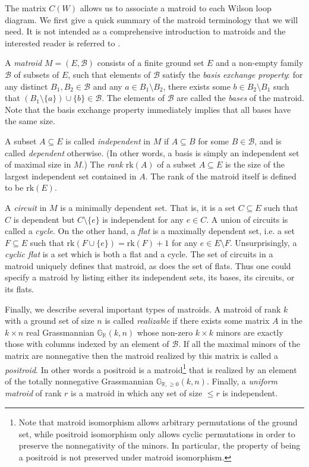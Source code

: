 \documentclass[11pt]{article}
\newcommand{\R}{\mathbb{R}}
\newcommand{\Gr}{\mathbb{G}_{\R, \geq 0}}
\newcommand{\rk}{\textrm{rk} }
\newcommand{\cB}{\mathcal{B}}
\theoremstyle{remark}
\theoremstyle{definition}
\begin{document}
The matrix $C(W)$ allows us to associate a matroid to each Wilson loop diagram. We first give a quick summary of the matroid terminology that we will need.  It is not intended as a comprehensive introduction to matroids and the interested reader is referred to \cite{OxleyMatroidBook}.

A {\em matroid} $M = (E,\cB)$ consists of a finite ground set $E$ and a non-empty family $\cB$ of subsets of $E$, such that elements of $\cB$ satisfy the {\em basis exchange property}: for any distinct $B_1,B_2 \in \cB$ and any $a \in B_1 \setminus B_2$, there exists some $b \in B_2 \setminus B_1$ such that $(B_1 \setminus \{a\})\cup \{b\} \in \cB$. The elements of $\cB$ are called the {\em bases} of the matroid. Note that the basis exchange property immediately implies that all bases have the same size.

A subset $A \subseteq E$ is called {\em independent} in $M$ if $A \subseteq B$ for some $B \in \cB$, and is called {\em dependent} otherwise. (In other words, a basis is simply an independent set of maximal size in $M$.) The {\em rank}  $\rk(A)$ of a subset $A \subseteq E$ is the size of the largest independent set contained in $A$. The rank of the matroid itself is defined to be $\rk(E)$.

A {\em circuit} in $M$ is a minimally dependent set. That is, it is a set $C \subseteq E$ such that $C$ is dependent but $C \setminus \{e\}$ is independent for any $e \in C$. A union of circuits is called a {\em cycle}. On the other hand, a {\em flat} is a maximally dependent set, i.e. a set $F \subseteq E$ such that $\rk(F \cup \{e\}) = \rk(F) + 1$ for any $e \in E \setminus F$. Unsurprisingly, a {\em cyclic flat} is a set which is both a flat and a cycle. The set of circuits in a matroid uniquely defines that matroid, as does the set of flats.  Thus one could specify a matroid by listing either its independent sets, its bases, its circuits, or its flats.

Finally, we describe several important types of matroids. A matroid of rank $k$ with a ground set of size $n$ is called {\em realizable} if there exists some matrix $A$ in the $k\times n$ real Grassmannian $\mathbb{G}_{\mathbb{R}}(k,n)$ whose non-zero $k\times k$ minors are exactly those with columns indexed by an element of $\cB$. If all the maximal minors of the matrix are nonnegative then the matroid realized by this matrix is called a {\em positroid}.  In other words a positroid is a matroid\footnote{Note that matroid isomorphism allows arbitrary permutations of the ground set, while positroid isomorphism only allows cyclic permutations in order to preserve the nonnegativity of the minors.  In particular, the property of being a positroid is not preserved under matroid isomorphism.} that is realized by an element of the totally nonnegative Grassmannian $\Gr(k,n)$. Finally, a {\em uniform matroid} of rank $r$ is a matroid in which any set of size $\leq r$ is independent.
\end{document}
